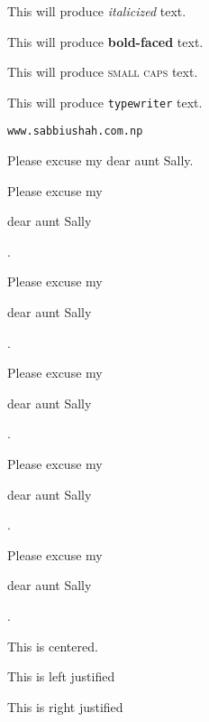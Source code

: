 \documentclass[11pt]{article}
\begin{document}
This will produce \textit{italicized} text.

This will produce \textbf{bold-faced} text.

This will produce \textsc{small caps} text.

This will produce \texttt{typewriter} text.

\texttt{www.sabbiushah.com.np}

Please excuse my dear aunt Sally.

Please excuse my \begin{large}dear aunt Sally\end{large}.

Please excuse my \begin{Large}dear aunt Sally\end{Large}.

Please excuse my \begin{huge} dear aunt Sally\end{huge}.

Please excuse my \begin{small} dear aunt Sally\end{small}.

Please excuse my \begin{tiny} dear aunt Sally\end{tiny}.

\begin{center}
This is centered.
\end{center}

\begin{flushleft}
This is left justified
\end{flushleft}

\begin{flushright}
This is right justified
\end{flushright}
\end{document}
